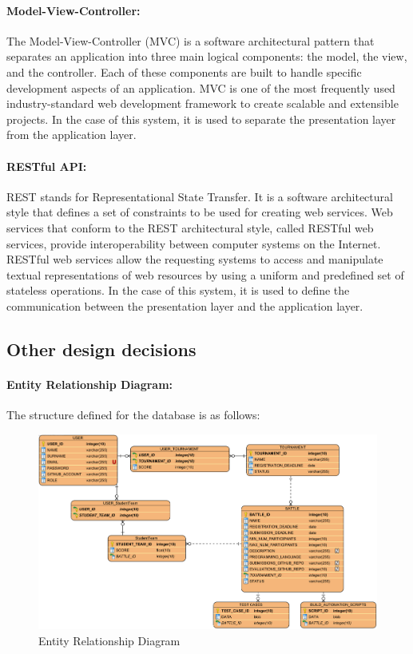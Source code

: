 \documentclass{article}
\begin{document}
\paragraph{Model-View-Controller:}

The Model-View-Controller (MVC) is a software architectural pattern that separates an application into three main logical components: the model, the view, and the controller. Each of these components are built to handle specific development aspects of an application. MVC is one of the most frequently used industry-standard web development framework to create scalable and extensible projects.
In the case of this system, it is used to separate the presentation layer from the application layer.

\paragraph{RESTful API:}

REST stands for Representational State Transfer. It is a software architectural style that defines a set of constraints to be used for creating web services. Web services that conform to the REST architectural style, called RESTful web services, provide interoperability between computer systems on the Internet. RESTful web services allow the requesting systems to access and manipulate textual representations of web resources by using a uniform and predefined set of stateless operations. In the case of this system, it is used to define the communication between the presentation layer and the application layer.

\subsection{Other design decisions}

\paragraph{Entity Relationship Diagram:}

The structure defined for the database is as follows:

\begin{figure}[H]
    \centering
    \includegraphics[width=1\textwidth]{images/EntityRelationshipDiagram.png}
    \caption{Entity Relationship Diagram}
    \label{fig:EntityRelationshipDiagram}
\end{figure}
\end{document}
